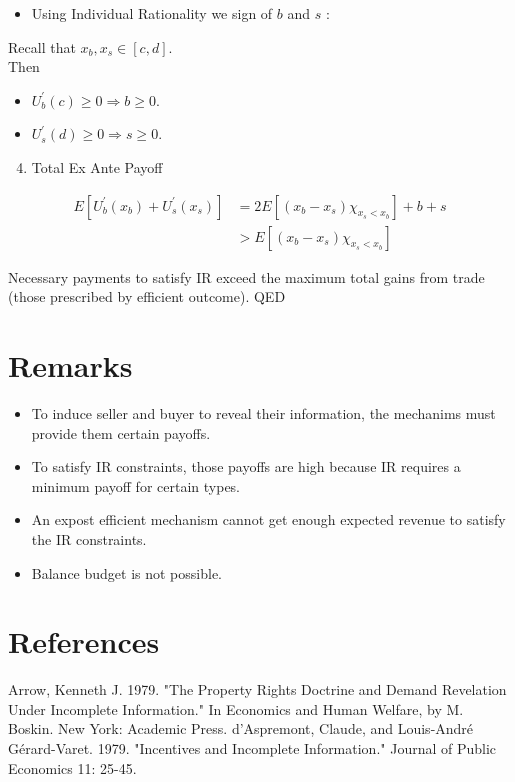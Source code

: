 \documentclass[10pt]{article}
\begin{document}
\begin{itemize}
  \item Using Individual Rationality we sign of $b$ and $s$ :
\end{itemize}

Recall that $x_{b}, x_{s} \in[c, d]$.\\
Then

\begin{itemize}
  \item $U_{b}^{\prime}(c) \geq 0 \Rightarrow b \geq 0$.
  \item $U_{s}^{\prime}(d) \geq 0 \Rightarrow s \geq 0$.
\end{itemize}

\begin{enumerate}
  \setcounter{enumi}{3}
  \item Total Ex Ante Payoff
\end{enumerate}

$$
\begin{aligned}
E\left[U_{b}^{\prime}\left(x_{b}\right)+U_{s}^{\prime}\left(x_{s}\right)\right] & =2 E\left[\left(x_{b}-x_{s}\right) \chi_{x_{s}<x_{b}}\right]+b+s \\
& >E\left[\left(x_{b}-x_{s}\right) \chi_{x_{s}<x_{b}}\right]
\end{aligned}
$$

Necessary payments to satisfy IR exceed the maximum total gains from trade (those prescribed by efficient outcome). QED

\section*{Remarks}
\begin{itemize}
  \item To induce seller and buyer to reveal their information, the mechanims must provide them certain payoffs.
  \item To satisfy IR constraints, those payoffs are high because IR requires a minimum payoff for certain types.
  \item An expost efficient mechanism cannot get enough expected revenue to satisfy the IR constraints.
  \item Balance budget is not possible.
\end{itemize}

\section*{References}
Arrow, Kenneth J. 1979. "The Property Rights Doctrine and Demand Revelation Under Incomplete Information." In Economics and Human Welfare, by M. Boskin. New York: Academic Press. d'Aspremont, Claude, and Louis-André Gérard-Varet. 1979. "Incentives and Incomplete Information." Journal of Public Economics 11: 25-45.
\end{document}
